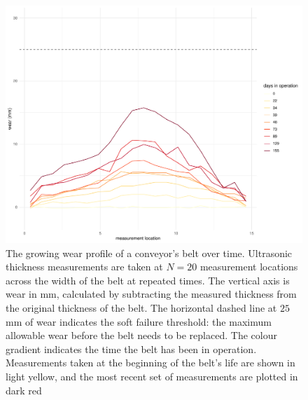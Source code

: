 \begin{figure}
  \centering
  \includegraphics[width=\textwidth]{figures/ch-6/main_belt.pdf}
  \caption{The growing wear profile of a conveyor's belt over time. Ultrasonic thickness measurements are taken at $N = 20$ measurement locations across the width of the belt at repeated times. The vertical axis is wear in mm, calculated by subtracting the measured thickness from the original thickness of the belt. The horizontal dashed line at $25$mm of wear indicates the soft failure threshold: the maximum allowable wear before the belt needs to be replaced. The colour gradient indicates the time the belt has been in operation. Measurements taken at the beginning of the belt's life are shown in light yellow, and the most recent set of measurements are plotted in dark red}
  \label{fig:ut-example}
\end{figure}

